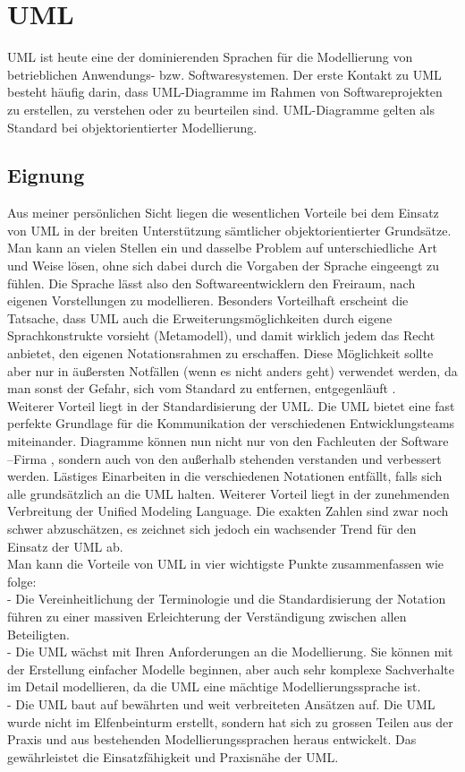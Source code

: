 \section{UML}
\label{sc:UMLB}
UML ist heute eine der dominierenden Sprachen für die Modellierung von betrieblichen Anwendungs- bzw. Softwaresystemen. Der erste Kontakt zu UML besteht häufig darin, dass UML-Diagramme im Rahmen von Softwareprojekten zu erstellen, zu verstehen oder zu beurteilen sind. UML-Diagramme gelten als Standard bei objektorientierter Modellierung.
\subsection{Eignung}

Aus meiner persönlichen Sicht liegen die wesentlichen Vorteile bei dem Einsatz von UML in der breiten Unterstützung sämtlicher objektorientierter Grundsätze. Man kann an vielen Stellen ein und dasselbe Problem auf unterschiedliche Art und Weise lösen, ohne sich dabei durch die Vorgaben der Sprache eingeengt zu fühlen. Die Sprache lässt also den Softwareentwicklern den Freiraum, nach eigenen Vorstellungen zu modellieren. Besonders Vorteilhaft erscheint die Tatsache, dass UML auch die Erweiterungsmöglichkeiten durch eigene Sprachkonstrukte vorsieht (Metamodell), und damit wirklich jedem das Recht anbietet, den eigenen Notationsrahmen zu erschaffen. Diese Möglichkeit sollte aber nur in äußersten Notfällen (wenn es nicht anders geht) verwendet werden, da man sonst der Gefahr, sich vom Standard zu entfernen, entgegenläuft .\\
Weiterer Vorteil liegt in der Standardisierung der UML. Die  UML bietet eine fast perfekte Grundlage für die Kommunikation der verschiedenen Entwicklungsteams miteinander. Diagramme können nun nicht nur von den Fachleuten der Software –Firma , sondern auch von den außerhalb stehenden verstanden und verbessert werden. Lästiges  Einarbeiten in die verschiedenen Notationen entfällt, falls sich alle grundsätzlich an die UML halten. 
Weiterer Vorteil liegt in der zunehmenden Verbreitung der Unified Modeling Language. Die exakten Zahlen sind zwar noch schwer abzuschätzen, es zeichnet sich jedoch ein wachsender Trend für den Einsatz der UML ab.\\
Man kann die Vorteile von UML in vier wichtigste Punkte zusammenfassen wie folge:\\

- Die Vereinheitlichung der Terminologie und die Standardisierung der Notation
führen zu einer massiven Erleichterung der Verständigung zwischen allen
Beteiligten.\\
- Die UML wächst mit Ihren Anforderungen an die Modellierung. Sie können mit der
Erstellung einfacher Modelle beginnen, aber auch sehr komplexe Sachverhalte im
Detail modellieren, da die UML eine mächtige Modellierungssprache ist.\\
- Die UML baut auf bewährten und weit verbreiteten Ansätzen auf. Die UML wurde
nicht im Elfenbeinturm erstellt, sondern hat sich zu grossen Teilen aus der Praxis
und aus bestehenden Modellierungssprachen heraus entwickelt. Das gewährleistet
die Einsatzfähigkeit und Praxisnähe der UML.\\

